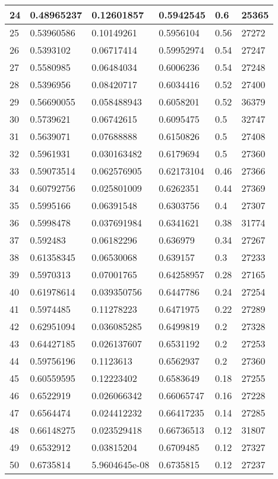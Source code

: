 \begin{longtable}{|l|l|l|l|l|l|}
24 & 0.48965237 & 0.12601857 & 0.5942545 & 0.6 & 25365 \\ \hline 
25 & 0.53960586 & 0.10149261 & 0.5956104 & 0.56 & 27272 \\ \hline 
26 & 0.5393102 & 0.06717414 & 0.59952974 & 0.54 & 27247 \\ \hline 
27 & 0.5580985 & 0.06484034 & 0.6006236 & 0.54 & 27248 \\ \hline 
28 & 0.5396956 & 0.08420717 & 0.6034416 & 0.52 & 27400 \\ \hline 
29 & 0.56690055 & 0.058488943 & 0.6058201 & 0.52 & 36379 \\ \hline 
30 & 0.5739621 & 0.06742615 & 0.6095475 & 0.5 & 32747 \\ \hline 
31 & 0.5639071 & 0.07688888 & 0.6150826 & 0.5 & 27408 \\ \hline 
32 & 0.5961931 & 0.030163482 & 0.6179694 & 0.5 & 27360 \\ \hline 
33 & 0.59073514 & 0.062576905 & 0.62173104 & 0.46 & 27366 \\ \hline 
34 & 0.60792756 & 0.025801009 & 0.6262351 & 0.44 & 27369 \\ \hline 
35 & 0.5995166 & 0.06391548 & 0.6303756 & 0.4 & 27307 \\ \hline 
36 & 0.5998478 & 0.037691984 & 0.6341621 & 0.38 & 31774 \\ \hline 
37 & 0.592483 & 0.06182296 & 0.636979 & 0.34 & 27267 \\ \hline 
38 & 0.61358345 & 0.06530068 & 0.639157 & 0.3 & 27233 \\ \hline 
39 & 0.5970313 & 0.07001765 & 0.64258957 & 0.28 & 27165 \\ \hline 
40 & 0.61978614 & 0.039350756 & 0.6447786 & 0.24 & 27254 \\ \hline 
41 & 0.5974485 & 0.11278223 & 0.6471975 & 0.22 & 27289 \\ \hline 
42 & 0.62951094 & 0.036085285 & 0.6499819 & 0.2 & 27328 \\ \hline 
43 & 0.64427185 & 0.026137607 & 0.6531192 & 0.2 & 27253 \\ \hline 
44 & 0.59756196 & 0.1123613 & 0.6562937 & 0.2 & 27360 \\ \hline 
45 & 0.60559595 & 0.12223402 & 0.6583649 & 0.18 & 27255 \\ \hline 
46 & 0.6522919 & 0.026066342 & 0.66065747 & 0.16 & 27228 \\ \hline 
47 & 0.6564474 & 0.024412232 & 0.66417235 & 0.14 & 27285 \\ \hline 
48 & 0.66148275 & 0.023529418 & 0.66736513 & 0.12 & 31807 \\ \hline 
49 & 0.6532912 & 0.03815204 & 0.6709485 & 0.12 & 27327 \\ \hline 
50 & 0.6735814 & 5.9604645e-08 & 0.6735815 & 0.12 & 27237 \\ \hline 
\end{longtable}